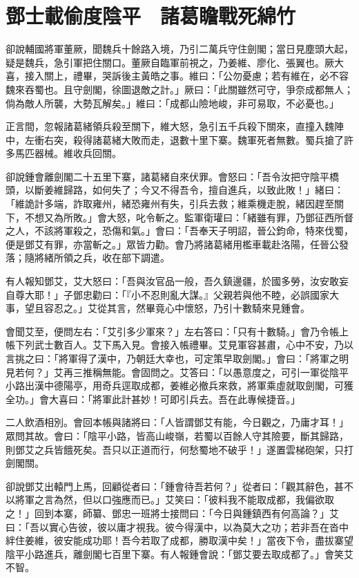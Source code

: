 
\chapter{鄧士載偷度陰平　諸葛瞻戰死綿竹}

卻說輔國將軍董厥，聞魏兵十餘路入境，乃引二萬兵守住劍閣；當日見塵頭大起，疑是魏兵，急引軍把住關口。董厥自臨軍前視之，乃姜維、廖化、張翼也。厥大喜，接入關上，禮畢，哭訴後主黃皓之事。維曰：「公勿憂慮；若有維在，必不容魏來吞蜀也。且守劍閣，徐圖退敵之計。」厥曰：「此關雖然可守，爭奈成都無人；倘為敵人所襲，大勢瓦解矣。」維曰：「成都山險地峻，非可易取，不必憂也。」

正言間，忽報諸葛緒領兵殺至關下，維大怒，急引五千兵殺下關來，直撞入魏陣中，左衝右突，殺得諸葛緒大敗而走，退數十里下寨。魏軍死者無數。蜀兵搶了許多馬匹器械。維收兵回關。

卻說鍾會離劍閣二十五里下寨，諸葛緒自來伏罪。會怒曰：「吾令汝把守陰平橋頭，以斷姜維歸路，如何失了；今又不得吾令，擅自進兵，以致此敗！」緒曰：「維詭計多端，詐取雍州，緒恐雍州有失，引兵去救；維乘機走脫，緒因趕至關下，不想又為所敗。」會大怒，叱令斬之。監軍衛瓘曰：「緒雖有罪，乃鄧征西所督之人，不該將軍殺之，恐傷和氣。」會曰：「吾奉天子明詔，晉公鈞命，特來伐蜀，便是鄧艾有罪，亦當斬之。」眾皆力勸。會乃將諸葛緒用檻車載赴洛陽，任晉公發落；隨將緒所領之兵，收在部下調遣。

有人報知鄧艾，艾大怒曰：「吾與汝官品一般，吾久鎮邊疆，於國多勞，汝安敢妄自尊大耶！」子鄧忠勸曰：「『小不忍則亂大謀。』父親若與他不睦，必誤國家大事，望且容忍之。」艾從其言，然畢竟心中懷怒，乃引十數騎來見鍾會。

會聞艾至，便問左右：「艾引多少軍來？」左右答曰：「只有十數騎。」會乃令帳上帳下列武士數百人。艾下馬入見。會接入帳禮畢。艾見軍容甚肅，心中不安，乃以言挑之曰：「將軍得了漢中，乃朝廷大幸也，可定策早取劍閣。」會曰：「將軍之明見若何？」艾再三推稱無能。會固問之。艾答曰：「以愚意度之，可引一軍從陰平小路出漢中德陽亭，用奇兵逕取成都，姜維必撤兵來救，將軍乘虛就取劍閣，可獲全功。」會大喜曰：「將軍此計甚妙！可即引兵去。吾在此專候捷音。」

二人飲酒相別。會回本帳與諸將曰：「人皆謂鄧艾有能，今日觀之，乃庸才耳！」眾問其故。會曰：「陰平小路，皆高山峻嶺，若蜀以百餘人守其險要，斷其歸路，則鄧艾之兵皆餓死矣。吾只以正道而行，何愁蜀地不破乎！」遂置雲梯砲架，只打劍閣關。

卻說鄧艾出轅門上馬，回顧從者曰：「鍾會待吾若何？」從者曰：「觀其辭色，甚不以將軍之言為然，但以口強應而已。」艾笑曰：「彼料我不能取成都，我偏欲取之！」回到本寨，師纂、鄧忠一班將士接問曰：「今日與鍾鎮西有何高論？」艾曰：「吾以實心告彼，彼以庸才視我。彼今得漢中，以為莫大之功；若非吾在沓中絆住姜維，彼安能成功耶！吾今若取了成都，勝取漢中矣！」當夜下令，盡拔寨望陰平小路進兵，離劍閣七百里下寨。有人報鍾會說：「鄧艾要去取成都了。」會笑艾不智。

